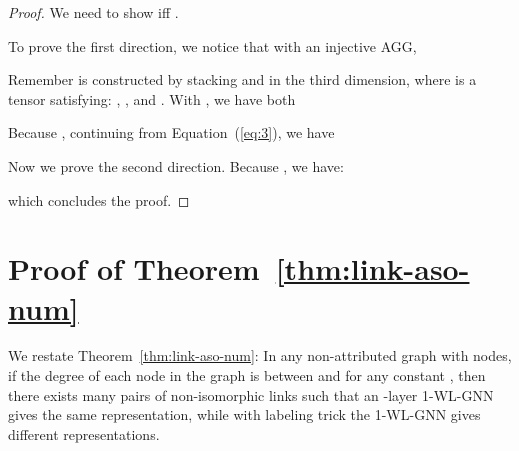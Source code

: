\documentclass{article}
\begin{document}
\begin{proof}

We need to show  iff .

To prove the first direction, we notice that with an injective AGG, 


Remember  is constructed by stacking  and  in the third dimension, where  is a tensor satisfying: ,  , and  . With , we have both 

Because , continuing from Equation~(\ref{eq:3}), we have


Now we prove the second direction. Because , we have:

which concludes the proof.

\end{proof}


\section{Proof of Theorem~\ref{thm:link-aso-num}}
We restate Theorem~\ref{thm:link-aso-num}: In any non-attributed graph with  nodes, if the degree of each node in the graph is between  and  for any constant , then there exists  many pairs of non-isomorphic links  such that an -layer \textnormal{1-WL-GNN} gives  the same representation, while with labeling trick the \textnormal{1-WL-GNN} gives  different representations.
\end{document}
